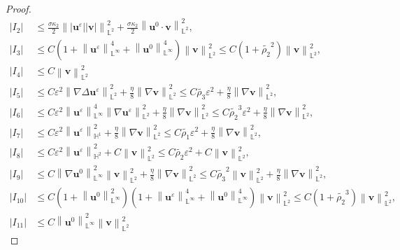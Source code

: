 \documentclass[11pt, reqno]{amsart}
\theoremstyle{definition}
\numberwithin{equation}{section}
\newcommand{\bff}{\boldsymbol}
\newcommand{\bb}{\mathbb}
\newcommand{\norm}[2]{\left\|{#1}\right\|_{#2}}
\newcommand{\abs}[1]{\left|{#1}\right|}
\begin{document}
\begin{proof}
\begin{align*}
    \abs{I_2}
    &\leq
    \frac{\sigma\kappa_2}{2} \norm{|\bff{u}^\varepsilon| |\bff{v}|}{\bb{L}^2}^2
    +
    \frac{\sigma\kappa_2}{2} \norm{\bff{u}^0 \cdot \bff{v}}{\bb{L}^2}^2,
    \\
    \abs{I_3}
    &\leq
    C \left(1+\norm{\bff{u}^\varepsilon}{\bb{L}^\infty}^4 + \norm{\bff{u}^0}{\bb{L}^\infty}^4 \right) \norm{\bff{v}}{\bb{L}^2}^2
    \leq
    C(1+\widetilde{\rho_2}^2) \norm{\bff{v}}{\bb{L}^2}^2,
    \\
    \abs{I_4}
    &\leq
    C\norm{\bff{v}}{\bb{L}^2}^2
    \\
    \abs{I_5}
    &\leq
    C\varepsilon^2 \norm{\nabla\Delta \bff{u}^\varepsilon}{\bb{L}^2}^2
    +
    \frac{\eta}{8} \norm{\nabla \bff{v}}{\bb{L}^2}^2
    \leq
    C\widetilde{\rho_3} \varepsilon^2 
    +
    \frac{\eta}{8} \norm{\nabla \bff{v}}{\bb{L}^2}^2,
    \\
    \abs{I_6}
    &\leq
    C\varepsilon^2 \norm{\bff{u}^\varepsilon}{\bb{L}^\infty}^4 \norm{\nabla \bff{u}^\varepsilon}{\bb{L}^2}^2
    +
    \frac{\eta}{8} \norm{\nabla \bff{v}}{\bb{L}^2}^2
    \leq
    C\widetilde{\rho_2}^3 \varepsilon^2
    +
    \frac{\eta}{8} \norm{\nabla \bff{v}}{\bb{L}^2}^2,
    \\
    \abs{I_7}
    &\leq
    C\varepsilon^2 \norm{\bff{u}^\varepsilon}{\bb{H}^1}^2
    +
    \frac{\eta}{8} \norm{\nabla \bff{v}}{\bb{L}^2}^2
    \leq
    C \widetilde{\rho_1} \varepsilon^2 
    +
    \frac{\eta}{8} \norm{\nabla \bff{v}}{\bb{L}^2}^2,
    \\
    \abs{I_8}
    &\leq
    C\varepsilon^2 \norm{\bff{u}^\varepsilon}{\bb{H}^2}^2
    +
    C \norm{\bff{v}}{\bb{L}^2}^2
    \leq
    C\widetilde{\rho_2} \varepsilon^2
    +
    C \norm{\bff{v}}{\bb{L}^2}^2,
    \\
    \abs{I_9}
    &\leq
    C \norm{\nabla \bff{u}^0}{\bb{L}^\infty}^2 \norm{\bff{v}}{\bb{L}^2}^2
    +
    \frac{\eta}{8} \norm{\nabla\bff{v}}{\bb{L}^2}^2
    \leq
    C\widetilde{\rho_3}^2 \norm{\bff{v}}{\bb{L}^2}^2
    +
    \frac{\eta}{8} \norm{\nabla \bff{v}}{\bb{L}^2}^2,
    \\
    \abs{I_{10}}
    &\leq
    C\left(1+\norm{\bff{u}^0}{\bb{L}^\infty}^2 \right) \left(1+\norm{\bff{u}^\varepsilon}{\bb{L}^\infty}^4 +\norm{\bff{u}^0}{\bb{L}^\infty}^4 \right) \norm{\bff{v}}{\bb{L}^2}^2
    \leq
    C(1+\widetilde{\rho_2}^3) \norm{\bff{v}}{\bb{L}^2}^2,
    \\
    \abs{I_{11}}
    &\leq
    C\norm{\bff{u}^0}{\bb{L}^\infty}^2 \norm{\bff{v}}{\bb{L}^2}^2

\end{align*}
\end{proof}
\end{document}

